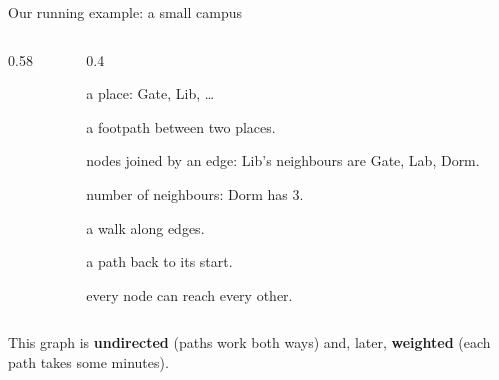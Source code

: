 \documentclass[aspectratio=169,10pt]{beamer}
\newcommand{\gA}{white}\newcommand{\gB}{white}\newcommand{\gC}{white}\newcommand{\gD}{white}\newcommand{\gE}{white}\newcommand{\gF}{white}
\newcommand{\campus}[1]{%
  \coordinate (pg) at (0,0); \coordinate (pl) at (2.6,1.5); \coordinate (pc) at (2.6,-1.5);
  \coordinate (pb) at (5.6,1.5); \coordinate (pd) at (5.6,-1.5); \coordinate (py) at (8.2,0);
  \ifnum#1=1
    \draw[tdInk!60] (pg) -- node[wl] {4} (pl); \draw[tdInk!60] (pg) -- node[wl] {2} (pc);
    \draw[tdInk!60] (pl) -- node[wl] {5} (pb); \draw[tdInk!60] (pl) -- node[wl,pos=0.3] {6} (pd);
    \draw[tdInk!60] (pc) -- node[wl] {3} (pd); \draw[tdInk!60] (pb) -- node[wl] {6} (py); \draw[tdInk!60] (pd) -- node[wl] {2} (py);
  \else
    \foreach \u/\v in {pg/pl,pg/pc,pl/pb,pl/pd,pc/pd,pb/py,pd/py}{\draw[tdInk!60] (\u) -- (\v);}
  \fi
  \node[gn,fill=\gA] (gate) at (pg) {Gate}; \node[gn,fill=\gB] (lib) at (pl) {Lib}; \node[gn,fill=\gC] (cafe) at (pc) {Cafe};
  \node[gn,fill=\gD] (lab) at (pb) {Lab}; \node[gn,fill=\gE] (dorm) at (pd) {Dorm}; \node[gn,fill=\gF] (gym) at (py) {Gym};}
\begin{document}
\begin{frame}{Our running example: a small campus}
\begin{columns}[T]
\begin{column}{0.58\textwidth}
\begin{sfig}[0.55]
\end{sfig}
\end{column}
\begin{column}{0.4\textwidth}
{\footnotesize
\begin{description}\setlength\itemsep{1pt}
\item[vertex / node] a place: Gate, Lib, \ldots
\item[edge] a footpath between two places.
\item[neighbours] nodes joined by an edge: Lib's neighbours are Gate, Lab, Dorm.
\item[degree] number of neighbours: Dorm has 3.
\item[path] a walk along edges.
\item[cycle] a path back to its start.
\item[connected] every node can reach every other.
\end{description}}
\end{column}
\end{columns}
{\small This graph is \textbf{undirected} (paths work both ways) and, later, \textbf{weighted} (each path takes some minutes).}
\end{frame}
\end{document}
